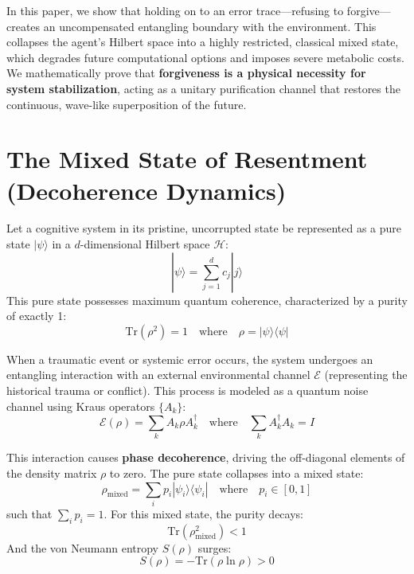 \documentclass[11pt,twocolumn]{article}
\begin{document}
In this paper, we show that holding on to an error trace---refusing to forgive---creates an uncompensated entangling boundary with the environment. This collapses the agent's Hilbert space into a highly restricted, classical mixed state, which degrades future computational options and imposes severe metabolic costs. We mathematically prove that \textbf{forgiveness is a physical necessity for system stabilization}, acting as a unitary purification channel that restores the continuous, wave-like superposition of the future.

\section{The Mixed State of Resentment \\ (Decoherence Dynamics)}

Let a cognitive system in its pristine, uncorrupted state be represented as a pure state $|\psi\rangle$ in a $d$-dimensional Hilbert space $\mathcal{H}$:
\begin{equation}
|\psi\rangle = \sum_{j=1}^{d} c_j |j\rangle
\end{equation}
This pure state possesses maximum quantum coherence, characterized by a purity of exactly 1:
\begin{equation}
\text{Tr}(\rho^2) = 1 \quad \text{where} \quad \rho = |\psi\rangle\langle\psi|
\end{equation}

When a traumatic event or systemic error occurs, the system undergoes an entangling interaction with an external environmental channel $\mathcal{E}$ (representing the historical trauma or conflict). This process is modeled as a quantum noise channel using Kraus operators $\{A_k\}$:
\begin{equation}
\mathcal{E}(\rho) = \sum_{k} A_k \rho A_k^\dagger \quad \text{where} \quad \sum_k A_k^\dagger A_k = I
\end{equation}

This interaction causes \textbf{phase decoherence}, driving the off-diagonal elements of the density matrix $\rho$ to zero. The pure state collapses into a mixed state:
\begin{equation}
\rho_{\text{mixed}} = \sum_i p_i |\psi_i\rangle\langle\psi_i| \quad \text{where} \quad p_i \in [0, 1]
\end{equation}
such that $\sum_i p_i = 1$. For this mixed state, the purity decays:
\begin{equation}
\text{Tr}(\rho_{\text{mixed}}^2) < 1
\end{equation}
And the von Neumann entropy $S(\rho)$ surges:
\begin{equation}
S(\rho) = -\text{Tr}(\rho \ln \rho) > 0
\end{equation}
\end{document}
